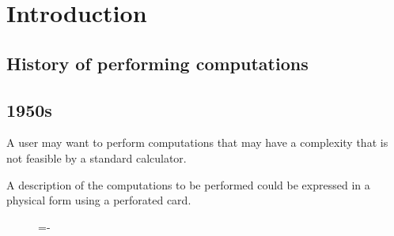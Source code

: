 \documentclass[a4paper]{systems-software}
\begin{document}
\tsbook{}
       {}
       {}
       {}
       {}{}{}
       {}
       {}
       
\raggedbottom


\setcounter{page}{1}

\chapter{Introduction}

\section{History of performing computations}

\section*{1950s}

A user may want to perform computations that may have a complexity that is not feasible by a standard calculator.

A description of the computations to be performed could be expressed in a physical form using a perforated card.

\begin{figure}[H]
  \lineskip=-\fboxrule
\end{figure}
\end{document}
